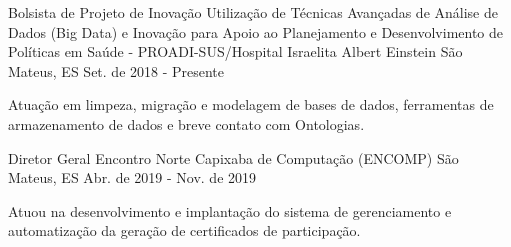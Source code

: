 

\begin{cventries}

  \cventry
    {Bolsista de Projeto de Inovação} %
    {Utilização de Técnicas Avançadas de Análise de Dados (Big Data) e Inovação para Apoio ao Planejamento e Desenvolvimento de Políticas em Saúde - PROADI-SUS/Hospital Israelita Albert Einstein } %
    {São Mateus, ES} %
    {Set. de 2018 - Presente} %
    {
      \begin{cvitems} %
        \item {Atuação em limpeza, migração e modelagem de bases de dados, ferramentas de armazenamento de dados e breve contato com Ontologias.}
      \end{cvitems}
    }

  \cventry
    {Diretor Geral} %
    {Encontro Norte Capixaba de Computação (ENCOMP)} %
    {São Mateus, ES} %
    {Abr. de 2019 - Nov. de 2019} %
    {
      \begin{cvitems} %
        \item {Atuou na desenvolvimento e implantação do sistema de gerenciamento e automatização da geração de certificados de participação. }
      \end{cvitems}
    }
	


\end{cventries}
